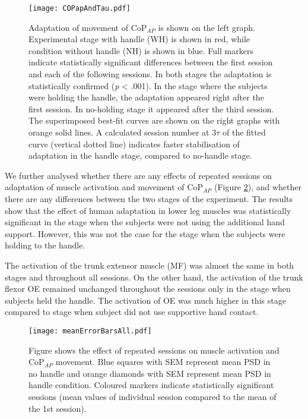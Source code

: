 \begin{figure}[!t]
	\begin{center}
		\texttt{[image: COPapAndTau.pdf]}
		\caption{Adaptation of movement of CoP$_{AP}$ is shown on the left graph. Experimental stage with handle (WH) is shown in red, while condition without handle (NH) is shown in blue. Full markers indicate statistically significant differences between the first session and each of the following sessions. In both stages the adaptation is statistically confirmed (\textit{p} < .001). In the stage where the subjects were holding the handle, the adaptation appeared right after the first session. In no-holding stage it appeared after the third session. The superimposed best-fit curves are shown on the right graphs with orange solid lines. A calculated session number at 3$\tau$ of the fitted curve (vertical dotted line) indicates faster stabilisation of adaptation in the handle stage, compared to no-handle stage.}
		\label{fig:COPapAndTau}
	\end{center}
\end{figure}

We further analysed whether there are any effects of repeated sessions on adaptation of muscle activation and movement of CoP$_{AP}$ (Figure \ref{fig:meanErrorBars}), and whether there are any differences between the two stages of the experiment. The results show that the effect of human adaptation in lower leg muscles was statistically significant in the stage when the subjects were not using the additional hand support. However, this was not the case for the stage when the subjects were holding to the handle.

The activation of the trunk extensor muscle (MF) was almost the same in both stages and throughout all sessions. On the other hand, the activation of the trunk flexor OE remained unchanged throughout the sessions only in the stage when subjects held the handle. The activation of OE was much higher in this stage compared to stage when subject did not use supportive hand contact.

\begin{figure}[!t]
	\begin{center}
		\texttt{[image: meanErrorBarsAll.pdf]}
		\caption{Figure shows the effect of repeated sessions on muscle activation and CoP$_{AP}$ movement. Blue squares with SEM represent mean PSD in no handle and orange diamonds with SEM represent mean PSD in handle condition. Coloured markers indicate statistically significant sessions (mean values of individual session compared to the mean of the 1st session).}
		\label{fig:meanErrorBars}
	\end{center}
\end{figure}

